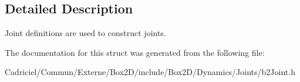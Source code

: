 \subsection{Detailed Description}
Joint definitions are used to construct joints. 

The documentation for this struct was generated from the following file\+:\begin{DoxyCompactItemize}
\item 
Cadriciel/\+Commun/\+Externe/\+Box2\+D/include/\+Box2\+D/\+Dynamics/\+Joints/b2\+Joint.\+h\end{DoxyCompactItemize}
